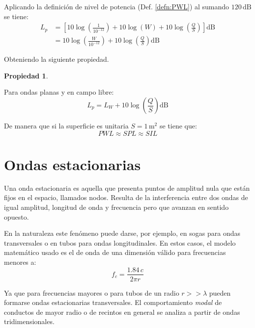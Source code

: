 \documentclass[a5paper,12pt,twoside]{book}
\newtheorem{prop}{{Propiedad}}[chapter]
\begin{document}
Aplicando la definición de nivel de potencia (Def. \ref{defn:PWL}) al sumando $120\,\si{\deci\bel}$ se tiene:
\begin{align*}
    L_p &= \left[ 10 \log \left( \frac{1}{10^{-12}} \right) + 10 \log(W) + 10 \log \left( \frac{Q}{S} \right) \right] \si{\deci\bel}
    \\
    &= 10 \log \left( \frac{W}{10^{-12}} \right) + 10 \log \left( \frac{Q}{S} \right) \si{\deci\bel}
\end{align*}

Obteniendo la siguiente propiedad.

\begin{mdframed}[style=MyFrame1]
    \begin{prop}
    \end{prop}
    Para ondas planas y en campo libre:
    \begin{equation*}
        L_p = L_W + 10 \log \left( \frac{Q}{S} \right) \si{\deci\bel}
    \end{equation*}
\end{mdframed}

De manera que si la superficie es unitaria $S=1\,\si{\metre^2}$ se tiene que:
\begin{equation*}
    PWL \approx SPL \approx SIL
\end{equation*}


\chapter{Ondas estacionarias}
\label{cha:standingWaves}

Una onda estacionaria es aquella que presenta puntos de amplitud nula que están fijos en el espacio, llamados nodos. Resulta de la interferencia entre dos ondas de igual amplitud, longitud de onda y frecuencia pero que avanzan en sentido opuesto.

En la naturaleza este fenómeno puede darse, por ejemplo, en sogas para ondas transversales o en tubos para ondas longitudinales. En estos casos, el modelo matemático usado es el de onda de una dimensión válido para frecuencias menores a:
\begin{equation*}
    f_c = \frac{1.84 \, c}{2\pi r}
\end{equation*}

Ya que para frecuencias mayores o para tubos de un radio $r>>\lambda$ pueden formarse ondas estacionarias transversales. El comportamiento \emph{modal} de conductos de mayor radio o de recintos en general se analiza a partir de ondas tridimensionales.
\end{document}
